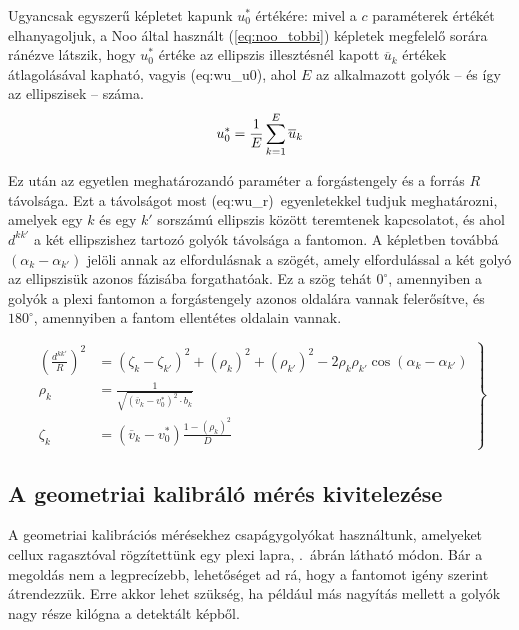 \documentclass[a4paper,12pt]{article}
\begin{document}
Ugyancsak egyszerű képletet kapunk $u_0^*$ értékére: mivel a $c$ paraméterek értékét elhanyagoljuk, a Noo által használt (\ref{eq:noo_tobbi}) képletek megfelelő sorára ránézve látszik, hogy $u_0^*$ értéke az ellipszis illesztésnél kapott $\overline{u}_k$ értékek átlagolásával kapható, vagyis  \aref({eq:wu_u0}), ahol $E$ az alkalmazott golyók -- és így az ellipszisek -- száma. 
\begin{equation}
\label{eq:wu_u0}
u_0^* = \frac{1}{E} \sum_{k=1}^E \overline{u}_k\\
\end{equation}


Ez után az egyetlen meghatározandó paraméter a forgástengely és a forrás $R$ távolsága. Ezt a távolságot most \aref({eq:wu_r})~egyenletekkel tudjuk meghatározni, amelyek egy $k$ és egy $k'$ sorszámú ellipszis között teremtenek kapcsolatot, és ahol $d^{kk'}$ a két  ellipszishez tartozó golyók távolsága a fantomon. A képletben továbbá $ \left ( \alpha_k - \alpha_{k'} \right )$ jelöli annak az elfordulásnak a szögét, amely elfordulással a két golyó az ellipszisük azonos fázisába forgathatóak. Ez a szög tehát $0^\circ$, amennyiben a golyók a plexi fantomon a forgástengely azonos oldalára vannak felerősítve, és $180^\circ$, amennyiben a fantom ellentétes oldalain vannak.

\begin{equation}
\label{eq:wu_r}
\left .
\begin{split}
\left( \frac{d^{kk'}}{R} \right) ^2 & = \left ( \zeta_k - \zeta_{k'}  \right )^2  +  \left (\rho_{k} \right )^2 + \left (\rho_{k'} \right )^2  - 2\rho_k \rho_{k'} \cos  \left ( \alpha_k - \alpha_{k'} \right ) \\
\rho_k &= \frac{1}{\sqrt{\left (\overline{v}_k - v_0^* \right)^2 \cdot b_k}}\\
\zeta_k &= \left ( \overline{v}_k  - v_0^* \right ) \frac{ 1- \left( \rho_k \right) ^2 }{D} 
\end{split}
\right\}
\end{equation}


\subsection{A geometriai kalibráló mérés kivitelezése}

A geometriai kalibrációs mérésekhez csapágygolyókat használtunk, amelyeket cellux ragasztóval rögzítettünk egy plexi lapra, .~ábrán látható módon. Bár a megoldás nem a legprecízebb, lehetőséget ad rá, hogy a fantomot igény szerint átrendezzük. Erre akkor lehet szükség, ha például más nagyítás mellett a golyók nagy része kilógna a detektált képből.
\end{document}
